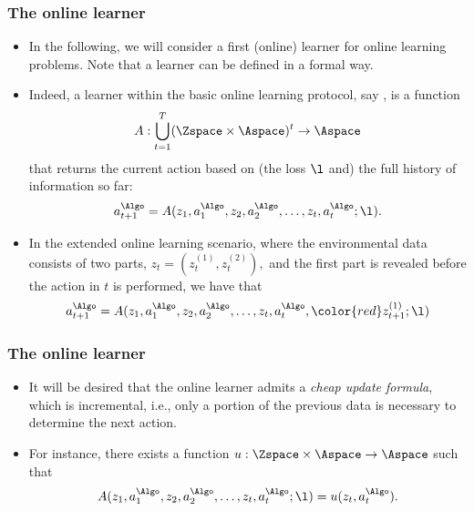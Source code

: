 \documentclass[11pt,compress,t,notes=noshow, xcolor=table]{beamer}
\begin{document}



\sloppy


\begin{frame}
	\frametitle{The online learner}
	\small
	\begin{itemize}
		\item In the following, we will consider a first (online) learner for   online learning problems. Note that a learner can be defined in a formal way.
		\pause
%		
		\item Indeed, a learner within the basic online learning protocol, say \Algo, is a function $$A: \bigcup_{t=1}^T (\Zspace \times \Aspace)^t \to \Aspace$$ that returns the current action based on (the loss $\l$ and) the full history of information so far:
		$$	a_{t+1}^{\Algo} = A(z_1,a_1^{\Algo},z_2,a_2^{\Algo},\ldots,z_t,a_t^{\Algo};\l).		$$
		\pause
		\item In the extended online learning scenario, where the environmental data consists of two parts, $z_t=(z_t^{(1)},z_t^{(2)}   ),$ and the {\color{red}first part is revealed before the action in $t$ is performed}, we have that
		$$	a_{t+1}^{\Algo} =  A(z_1,a_1^{\Algo},z_2,a_2^{\Algo},\ldots,z_t,a_t^{\Algo},{\color{red} z_{t+1}^{(1)}};\l)  		$$

%		
				 
	\end{itemize}
\end{frame}


\begin{frame}
	\frametitle{The online learner}
	\small
	\begin{itemize}
 		\item It will be desired that the online learner admits a \emph{cheap update formula}, which is incremental, i.e., only a portion of the previous data is necessary to determine the next action.
		\item  For instance, there exists a function $u:\Zspace \times \Aspace \to \Aspace$ such that 
		$$	A(z_1,a_1^{\Algo},z_2,a_2^{\Algo},\ldots,z_t,a_t^{\Algo};\l) = u(z_t,a_t^{\Algo}).$$
		
	\end{itemize}
\end{frame}
\end{document}
